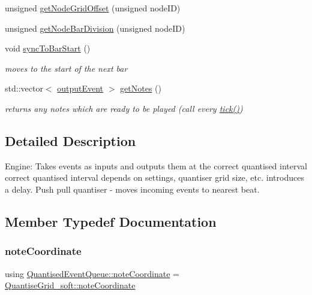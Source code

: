 \begin{DoxyCompactItemize}
\item 
unsigned \mbox{\hyperlink{classQuantisedEventQueue_a003bdcedf16297e3e2e6ed90c413da4c}{get\+Node\+Grid\+Offset}} (unsigned node\+ID)
\item 
unsigned \mbox{\hyperlink{classQuantisedEventQueue_a21c0f8d70e22bb02dcb110ecc610a9dd}{get\+Node\+Bar\+Division}} (unsigned node\+ID)
\item 
void \mbox{\hyperlink{classQuantisedEventQueue_ab14d954f402e83c2aaed7ff38a73ac47}{sync\+To\+Bar\+Start}} ()
\begin{DoxyCompactList}\small\item\em moves to the start of the next bar \end{DoxyCompactList}\item 
std\+::vector$<$ \mbox{\hyperlink{structQuantisedEventQueue_1_1outputEvent}{output\+Event}} $>$ \mbox{\hyperlink{classQuantisedEventQueue_ae3ec71da38982933666fb17dde454709}{get\+Notes}} ()
\begin{DoxyCompactList}\small\item\em returns any notes which are ready to be played (call every \mbox{\hyperlink{classQuantisedEventQueue_a97055bead1291aef1d540640fcb61bf9}{tick()}}) \end{DoxyCompactList}\end{DoxyCompactItemize}


\subsection{Detailed Description}
Engine\+: Takes events as inputs and outputs them at the correct quantised interval correct quantised interval depends on settings, quantiser grid size, etc. introduces a delay. Push pull quantiser -\/ moves incoming events to nearest beat. 

\subsection{Member Typedef Documentation}
\mbox{\label{classQuantisedEventQueue_a7e4af70d71f881cb31e643f59c6cf6e6}} 
\subsubsection{\texorpdfstring{note\+Coordinate}{noteCoordinate}}
{\footnotesize\ttfamily using \mbox{\hyperlink{classQuantisedEventQueue_a7e4af70d71f881cb31e643f59c6cf6e6}{Quantised\+Event\+Queue\+::note\+Coordinate}} =  \mbox{\hyperlink{structQuantiseGrid__soft_1_1noteCoordinate}{Quantise\+Grid\+\_\+soft\+::note\+Coordinate}}}



